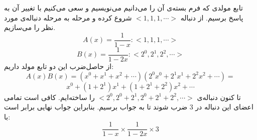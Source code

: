 \p
تابع مولدی که فرم بسته‌ی آن را می‌دانیم می‌نویسیم و سعی می‌کنیم با تغییر آن به پاسخ برسیم. از دنباله
$< 1, 1, 1, \cdots >$
شروع کرده و مرحله به مرحله دنباله‌ی مورد نظر را می‌سازیم.
$$A(x) = \frac{1}{1-x}: < 1, 1, 1, \cdots >$$
$$B(x) = \frac{1}{1-2x}: < 2^0, 2^1, 2^2, \cdots >$$
از حاصل‌ضرب این دو تابع مولد داریم:
$$A(x)B(x) = (x^0 + x^1 + x^2 + \cdots)(2^0x^0 + 2^1x^1 + 2^2x^2 + \cdots)=$$
$$x^0 + (1 + 2^1)x^1 + (1 + 2^1 + 2^2)x^2 + \cdots$$
تا کنون دنباله‌ی
$< 2^0, 2^0 + 2^1, 2^0 + 2^1 + 2^2, \cdots >$
را ساخته‌ایم. کافی است تمامی اعضای این دنباله در
$3$
ضرب شوند تا به جواب برسیم. بنابراین جواب نهایی برابر است با:
$$\frac{1}{1-x}\times\frac{1}{1-2x}\times3$$